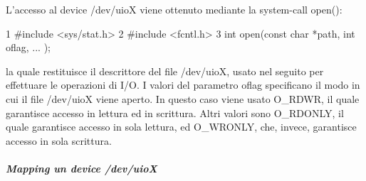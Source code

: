 L'accesso al device /dev/uio\+X viene ottenuto mediante la system-\/call open()\+: 
\begin{DoxyCode}
1 #include <sys/stat.h>
2 #include <fcntl.h>
3 int open(const char *path, int oflag, ...  );
\end{DoxyCode}
 la quale restituisce il descrittore del file /dev/uio\+X, usato nel seguito per effettuare le operazioni di I/\+O. I valori del parametro oflag specificano il modo in cui il file /dev/uio\+X viene aperto. In questo caso viene usato O\+\_\+\+R\+D\+W\+R, il quale garantisce accesso in lettura ed in scrittura. Altri valori sono O\+\_\+\+R\+D\+O\+N\+L\+Y, il quale garantisce accesso in sola lettura, ed O\+\_\+\+W\+R\+O\+N\+L\+Y, che, invece, garantisce accesso in sola scrittura.

\subparagraph*{Mapping un device /dev/uio\+X}


